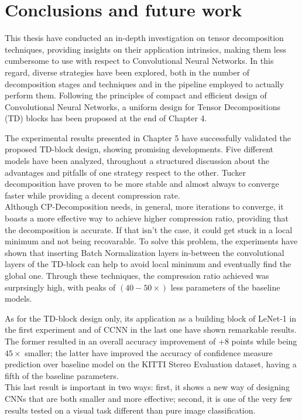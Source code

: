 
\chapter{Conclusions and future work} %
\label{Chapter6}
This thesis have conducted an in-depth investigation on tensor decomposition techniques, providing insights on their application intrinsics, making them less cumbersome to use with respect to Convolutional Neural Networks. In this regard, diverse strategies have been explored, both in the number of decomposition stages and techniques and in the pipeline employed to actually perform them. Following the principles of compact and efficient design of Convolutional Neural Networks, a uniform design for Tensor Decompositions (TD) blocks has been proposed at the end of Chapter 4.
\newline 


The experimental results presented in Chapter 5 have successfully validated the proposed TD-block design, showing promising developments. Five different models have been analyzed, throughout a structured discussion about the advantages and pitfalls of one strategy respect to the other. Tucker decomposition have proven to be more stable and almost always to converge faster while providing a decent compression rate.  \\
Although CP-Decomposition needs, in general, more iterations to converge, it boasts a more effective way to achieve higher compression ratio, providing that the decomposition is accurate. If that isn't the case, it could get stuck in a local minimum and not being recovarable. To solve this problem, the experiments have shown that inserting Batch Normalization layers in-between the convolutional layers of the TD-block can help to avoid local minimum and eventually find the global one. Through these techniques, the compression ratio achieved was surprsingly high, with peaks of $(40-50 \times)$ less parameters of the baseline models. 
\newline 


As for the TD-block design only, its application as a building block of LeNet-1 in the first experiment and of CCNN in the last one have shown remarkable results. The former resulted in an overall accuracy improvement of +8 points while being $45\times$ smaller; the latter have improved the accuracy of confidence measure prediction over baseline model on the KITTI Stereo Evaluation dataset, having a fifth of the baseline parameters. \\
This last result is important in two ways: first, it shows a new way of designing CNNs that are both smaller and more effective; second, it is one of the very few results tested on a visual task different than pure image classification. 
\newline 


